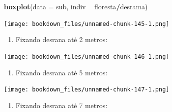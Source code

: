\documentclass[
]{article}
\newenvironment{Shaded}{\begin{snugshade}}{\end{snugshade}}
\newcommand{\DataTypeTok}[1]{\textcolor[rgb]{0.13,0.29,0.53}{#1}}
\newcommand{\DecValTok}[1]{\textcolor[rgb]{0.00,0.00,0.81}{#1}}
\newcommand{\KeywordTok}[1]{\textcolor[rgb]{0.13,0.29,0.53}{\textbf{#1}}}
\newcommand{\NormalTok}[1]{#1}
\newcommand{\OperatorTok}[1]{\textcolor[rgb]{0.81,0.36,0.00}{\textbf{#1}}}
\newcommand{\StringTok}[1]{\textcolor[rgb]{0.31,0.60,0.02}{#1}}
\providecommand{\tightlist}{%
  \setlength{\itemsep}{0pt}\setlength{\parskip}{0pt}}
\begin{document}
\begin{Shaded}
\begin{Highlighting}[]
\KeywordTok{boxplot}\NormalTok{(}\DataTypeTok{data =}\NormalTok{ sub, indiv }\OperatorTok{~}\StringTok{ }\NormalTok{floresta}\OperatorTok{/}\NormalTok{desrama)}
\end{Highlighting}
\end{Shaded}

\texttt{[image: bookdown\_files/unnamed-chunk-145-1.png]}

\begin{enumerate}
\def\labelenumi{\arabic{enumi}.}
\setcounter{enumi}{3}
\tightlist
\item
  Fixando desrana até 2 metros:
\end{enumerate}

\begin{Shaded}
\end{Shaded}

\texttt{[image: bookdown\_files/unnamed-chunk-146-1.png]}

\begin{enumerate}
\def\labelenumi{\arabic{enumi}.}
\setcounter{enumi}{4}
\tightlist
\item
  Fixando desrana até 5 metros:
\end{enumerate}

\begin{Shaded}
\end{Shaded}

\texttt{[image: bookdown\_files/unnamed-chunk-147-1.png]}

\begin{enumerate}
\def\labelenumi{\arabic{enumi}.}
\setcounter{enumi}{5}
\tightlist
\item
  Fixando desrana até 7 metros:
\end{enumerate}
\end{document}
